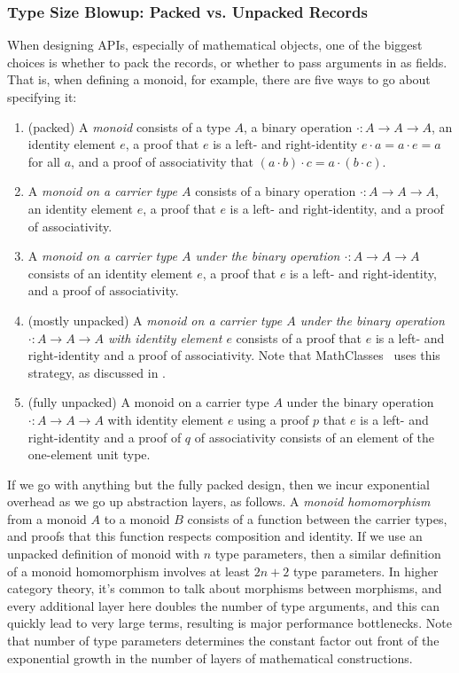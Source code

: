 \subsubsection{Type Size Blowup: Packed {vs.} Unpacked Records} \label{sec:abstraction-barriers:packed-records}
When designing APIs, especially of mathematical objects, one of the biggest choices is whether to pack the records, or whether to pass arguments in as fields.
That is, when defining a monoid, for example, there are five ways to go about specifying it:
\begin{enumerate}
    \item
    (packed)
    A \emph{monoid} consists of a type $A$, a binary operation $\cdot : A \to A \to A$, an identity element $e$, a proof that $e$ is a left- and right-identity $e \cdot a = a \cdot e = a$ for all $a$, and a proof of associativity that $(a \cdot b) \cdot c = a \cdot (b \cdot c)$.
    \item
    A \emph{monoid on a carrier type $A$} consists of a binary operation $\cdot : A \to A \to A$, an identity element $e$, a proof that $e$ is a left- and right-identity, and a proof of associativity.
    \item
    A \emph{monoid on a carrier type $A$ under the binary operation $\cdot : A \to A \to A$} consists of an identity element $e$, a proof that $e$ is a left- and right-identity, and a proof of associativity.
    \item
    (mostly unpacked)
    A \emph{monoid on a carrier type $A$ under the binary operation $\cdot : A \to A \to A$ with identity element $e$} consists of a proof that $e$ is a left- and right-identity and a proof of associativity.
    Note that MathClasses~\cite{MathClasses,Type2011Spitters} uses this strategy, as discussed in \textcite{Packaging2009Garillot}.
    \item
    (fully unpacked) A monoid on a carrier type $A$ under the binary operation $\cdot : A \to A \to A$ with identity element $e$ using a proof $p$ that $e$ is a left- and right-identity and a proof of $q$ of associativity consists of an element of the one-element unit type.
\end{enumerate}

If we go with anything but the fully packed design, then we incur exponential overhead as we go up abstraction layers, as follows.
A \emph{monoid homomorphism} from a monoid $A$ to a monoid $B$ consists of a function between the carrier types, and proofs that this function respects composition and identity.
If we use an unpacked definition of monoid with $n$ type parameters, then a similar definition of a monoid homomorphism involves at least $2n+2$ type parameters.
In higher category theory, it's common to talk about morphisms between morphisms, and every additional layer here doubles the number of type arguments, and this can quickly lead to very large terms, resulting is major performance bottlenecks.
Note that number of type parameters determines the constant factor out front of the exponential growth in the number of layers of mathematical constructions.

